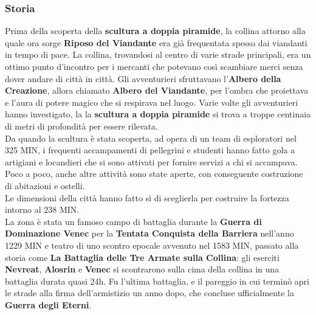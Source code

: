 \documentclass[10pt,twoside,onecolumn,openany]{book}
\begin{document}
\subsubsection{Storia}
Prima della scoperta della \textbf{scultura a doppia piramide}, la collina attorno alla quale ora sorge \textbf{Riposo del Viandante} era già frequentata spesso dai viandanti in tempo di pace. La collina, trovandosi al centro di varie strade principali, era un ottimo punto d'incontro per i mercanti che potevano così scambiare merci senza dover andare di città in città. Gli avventurieri sfruttavano l'\textbf{Albero della Creazione}, allora chiamato \textbf{Albero del Viandante}, per l'ombra che proiettava e l'aura di potere magico che si respirava nel luogo. Varie volte gli avventurieri hanno investigato, la la \textbf{scultura a doppia piramide} si trova a troppe centinaia di metri di profondità per essere rilevata.\\
Da quando la scultura è stata scoperta, ad opera di un team di esploratori nel 325 MIN, i frequenti accampamenti di pellegrini e studenti hanno fatto gola a artigiani e locandieri che si sono attivati per fornire servizi a chi si accampava. Poco a poco, anche altre attività sono state aperte, con conseguente costruzione di abitazioni e ostelli.\\
Le dimensioni della città hanno fatto sì di sceglierla per costruire la fortezza intorno al 238 MIN.\\
La zona è stata un famoso campo di battaglia durante la \textbf{Guerra di Dominazione Venec} per la \textbf{Tentata Conquista della Barriera} nell'anno 1229 MIN e teatro di uno scontro epocale avvenuto nel 1583 MIN, passato alla storia come \textbf{La Battaglia delle Tre Armate sulla Collina}: gli eserciti \textbf{Nevreat}, \textbf{Alosrin} e \textbf{Venec}  si scontrarono sulla cima della collina in una battaglia durata quasi 24h. Fu l'ultima battaglia, e il pareggio in cui terminò apri le strade alla firma dell'armistizio un anno dopo, che concluse ufficialmente la \textbf{Guerra degli Eterni}.
\newpage
\end{document}
